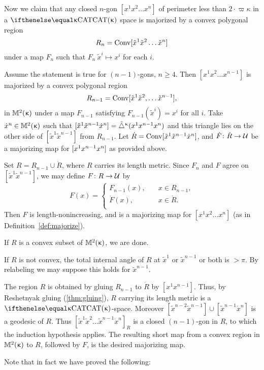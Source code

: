 Now we claim that any closed $n$-gon $[x^1x^2 \dots x^n ]$ of perimeter less than $2\cdot \varpi\kappa$ in a $\CAT{\kappa}$ space  is majorized by a convex polygonal region \[R_n=\Conv[\tilde x^1\tilde x^2\dots\tilde x^n]\]
under a map $F_n$ such that $F_n\:\tilde x^i\mapsto x^i$ for each $i$. 


Assume the statement is true for $(n-1)$-gons, $n\ge 4$.  
Then  $[x^1 x^2 \dots x^{n-1}]$  is majorized by a convex polygonal region 
\[R_{n-1}=\Conv[\tilde x^1 \tilde x^2,\dots \tilde x^{n-1}],\] 
in $\mathbb{M}_{{}}^{2}({\upkappa})$ under a map $F_{n-1}$ satisfying $F_{n-1}(\tilde x^i)=x^i$ for all $i$. 
Take $\dot x^n\in\Lob2{\kappa}$ such that $[{\tilde x^1}{\tilde x^{n-1}}{\dot x^n}]={\tilde\triangle}^{\upkappa}(x^1 x^{n-1} x^n)$ 
and this triangle lies on the other side of $[\tilde x^1\tilde x^{n-1}]$ from $R_{n-1}$.  
Let $\dot R\z=\Conv\trig{\tilde x^1}{\tilde x^{n-1}}{\dot x^n}$, 
and $\dot F\:\dot R\to \spc{U}$ be a majorizing map for $[{ x^1}{x^{n-1}}{ x^n}]$ as provided above.

Set 
$R= R_{n-1}\cup \dot R$, where $R$ carries its length metric.
Since $F_n$ and $F$ agree on $[\tilde x^1 \tilde x^{n-1}]$, we may define $F\:R\to\spc{U}$ by 
\[
F(x)=
\begin{cases}
F_{n-1}(x),\quad & x\in R_{n-1},\\
\dot F(x),\quad & x\in \dot R.\\
\end{cases}
\]
Then $F$ is length-nonincreasing, and is a majorizing map for $[x^1 x^2 \dots x^n ]$ (as in Definition~\ref{def:majorize}).

If $R$ is a convex subset of $\mathbb{M}_{{}}^{2}({\upkappa})$, we are done. 

If $R$ is not convex,  the total internal angle of $R$ at $\tilde x^1$ or $ \tilde x^{n-1} $ or both is $>\pi$.  
By relabeling we may suppose this holds for $\tilde x^{n-1}$.  

The region $R$ is obtained by gluing $R_{n-1}$ to $\dot R$ by $[x^1x^{n-1}]$.
Thus, by Reshetnyak gluing (\ref{thm:gluing}), $R$ carrying its length metric is a $\CAT{\kappa}$-space.  
Moreover $[\tilde x^{n-2}\tilde x^{n-1}]\cup[\tilde x^{n-1} \dot x^n]$ is a geodesic of $R$.
Thus $[\tilde x^1 \tilde x^2 \dots \tilde x^{n-1} \dot x^n]_R$ is a closed $(n-1)$-gon in $R$, to which the induction hypothesis applies. The resulting short map from a convex region in $ \mathbb{M}_{{}}^{2}({\upkappa})$ to $R$, followed by $F$,  is the desired majorizing map.

\medskip

Note that in fact we have proved the following:

